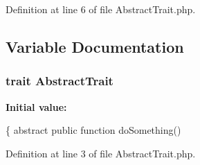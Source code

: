 Definition at line 6 of file Abstract\+Trait.\+php.



\subsection{Variable Documentation}
\subsubsection[{Abstract\+Trait}]{\setlength{\rightskip}{0pt plus 5cm}trait Abstract\+Trait}\label{_abstract_trait_8php_a318b09bd2aa175f2de5f7dd5fb869624}
{\bfseries Initial value\+:}
\begin{DoxyCode}
\{
    \textcolor{keyword}{abstract} \textcolor{keyword}{public} \textcolor{keyword}{function} doSomething()
\end{DoxyCode}


Definition at line 3 of file Abstract\+Trait.\+php.

